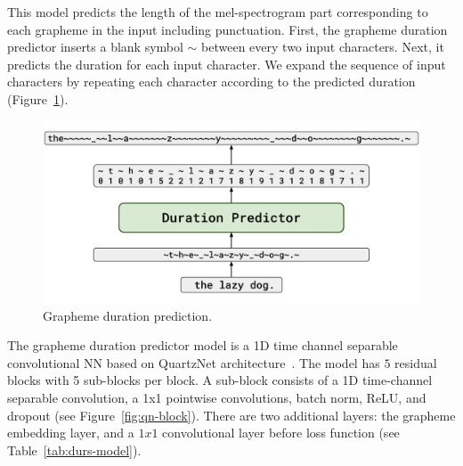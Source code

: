This model predicts the length of the mel-spectrogram part corresponding to each gra\-pheme in the input including punctuation. First, the grapheme duration predictor inserts a blank symbol $\sim$ between every two input characters. Next, it predicts the duration for each input character. We expand the sequence of input characters by repeating each character according to the predicted duration  (Figure~\ref{fig:durs}).

\begin{figure}[!ht]
\centering
\includegraphics[width=1.0\linewidth]{images/durs.png}
\caption{Grapheme duration prediction.}
\label{fig:durs}
\end{figure}

The grapheme duration predictor model is a 1D time channel separable convolutional NN based on QuartzNet architecture~\cite{quartznet}. The model has $5$ residual blocks with 5 sub-blocks per block. A sub-block consists of a 1D time-channel separable convolution, a 1x1 pointwise convolutions, batch norm, ReLU, and dropout (see Figure~\ref{fig:qn-block}). There are two additional layers: the grapheme embedding layer, and a $1x1$ convolutional layer before loss function (see Table~\ref{tab:durs-model}).

